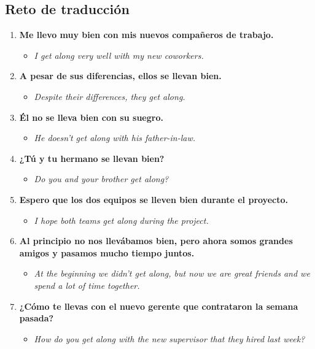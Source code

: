 \documentclass[
10pt, %
a4paper, %
oneside, %
headinclude,footinclude, %
BCOR5mm, %
]{scrartcl}
\begin{document}
\subsection{Reto de traducción}

\begin{enumerate}
	\item \textbf{Me llevo muy bien con mis nuevos compañeros de trabajo.}
	\begin{itemize}
		\item \textit{I get along very well with my new coworkers.}
	\end{itemize}
	\item \textbf{A pesar de sus diferencias, ellos se llevan bien.}
	\begin{itemize}
		\item \textit{Despite their differences, they get along.}
	\end{itemize}
	\item \textbf{Él no se lleva bien con su suegro.}
	\begin{itemize}
		\item \textit{He doesn't get along with his father-in-law.}
	\end{itemize}
	\item \textbf{¿Tú y tu hermano se llevan bien?}
	\begin{itemize}
		\item \textit{Do you and your brother get along?}
	\end{itemize}
	\item \textbf{Espero que los dos equipos se lleven bien durante el proyecto.}
	\begin{itemize}
		\item \textit{I hope both teams get along during the project.}
	\end{itemize}
	\item \textbf{Al principio no nos llevábamos bien, pero ahora somos grandes amigos y pasamos mucho tiempo juntos.}
	\begin{itemize}
		\item \textit{At the beginning we didn't get along, but now we are great friends and we spend a lot of time together.}
	\end{itemize}
	\item \textbf{¿Cómo te llevas con el nuevo gerente que contrataron la semana pasada?}
	\begin{itemize}
		\item \textit{How do you get along with the new supervisor that they hired last week?}

\end{itemize}
\end{enumerate}
\end{document}
